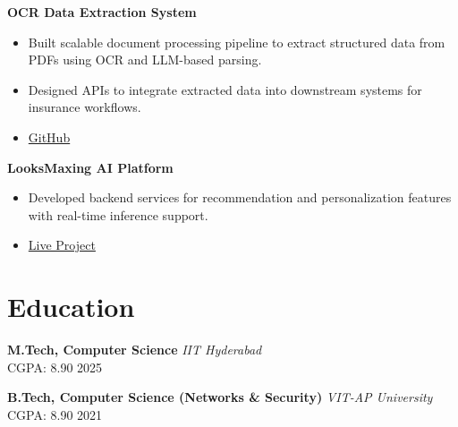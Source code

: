 \documentclass[10pt,a4paper]{article}
\newcommand{\resumeItem}[1]{\item\small{#1}}
\begin{document}
\textbf{OCR Data Extraction System}
\begin{itemize}[leftmargin=*,noitemsep]
    \resumeItem{Built scalable document processing pipeline to extract structured data from PDFs using OCR and LLM-based parsing.}
    \resumeItem{Designed APIs to integrate extracted data into downstream systems for insurance workflows.}
    \resumeItem{\href{https://github.com/kaulmesanyam/ocr-extractor}{GitHub}}
\end{itemize}

\vspace{4pt}

\textbf{LooksMaxing AI Platform}
\begin{itemize}[leftmargin=*,noitemsep]
    \resumeItem{Developed backend services for recommendation and personalization features with real-time inference support.}
    \resumeItem{\href{https://www.looksmaxxing.in/}{Live Project}}
\end{itemize}

\vspace{4pt}

\section{Education}

\textbf{M.Tech, Computer Science} \hfill \textit{IIT Hyderabad} \\
CGPA: 8.90 \hfill 2025

\vspace{2pt}

\textbf{B.Tech, Computer Science (Networks \& Security)} \hfill \textit{VIT-AP University} \\
CGPA: 8.90 \hfill 2021
\end{document}
